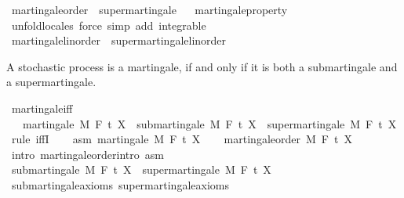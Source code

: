 \begin{isabellebody}
\isanewline
{}\isamarkupfalse%
\ martingale{\isacharunderscore}{\kern0pt}order\ {\isasymsubseteq}\ supermartingale%
\isadelimproof
\ %
\endisadelimproof
%
\isatagproof
{}\isamarkupfalse%
\ martingale{\isacharunderscore}{\kern0pt}property\ \isamarkupfalse%
\ {\isacharparenleft}{\kern0pt}unfold{\isacharunderscore}{\kern0pt}locales{\isacharparenright}{\kern0pt}\ {\isacharparenleft}{\kern0pt}force\ simp\ add{\isacharcolon}{\kern0pt}\ integrable{\isacharparenright}{\kern0pt}{\isacharplus}{\kern0pt}%
\endisatagproof
{\isafoldproof}%
%
\isadelimproof
%
\endisadelimproof
\isanewline
{}\isamarkupfalse%
\ martingale{\isacharunderscore}{\kern0pt}linorder\ {\isasymsubseteq}\ supermartingale{\isacharunderscore}{\kern0pt}linorder%
\isadelimproof
\ %
\endisadelimproof
%
\isatagproof
\isacommand{{\isachardot}{\kern0pt}{\isachardot}{\kern0pt}}\isamarkupfalse%
%
\endisatagproof
{\isafoldproof}%
%
\isadelimproof
%
\endisadelimproof
%
\begin{isamarkuptext}%
A stochastic process is a martingale, if and only if it is both a submartingale and a supermartingale.%
\end{isamarkuptext}\isamarkuptrue%
\isamarkupfalse%
\ martingale{\isacharunderscore}{\kern0pt}iff{\isacharcolon}{\kern0pt}\ \isanewline
\ \ \ {\isachardoublequoteopen}martingale\ M\ F\ t\ X\ {\isasymlongleftrightarrow}\ submartingale\ M\ F\ t\ X\ {\isasymand}\ supermartingale\ M\ F\ t\ X{\isachardoublequoteclose}\isanewline
%
\isadelimproof
%
\endisadelimproof
%
\isatagproof
{}\isamarkupfalse%
\ {\isacharparenleft}{\kern0pt}rule\ iffI{\isacharparenright}{\kern0pt}\isanewline
\ \ \isamarkupfalse%
\ asm{\isacharcolon}{\kern0pt}\ {\isachardoublequoteopen}martingale\ M\ F\ t\ X{\isachardoublequoteclose}\isanewline
\ \ \isamarkupfalse%
\ martingale{\isacharunderscore}{\kern0pt}order\ M\ F\ t\ X\ \isamarkupfalse%
\ {\isacharparenleft}{\kern0pt}intro\ martingale{\isacharunderscore}{\kern0pt}order{\isachardot}{\kern0pt}intro\ asm{\isacharparenright}{\kern0pt}\isanewline
\ \ \isamarkupfalse%
\ {\isachardoublequoteopen}submartingale\ M\ F\ t\ X\ {\isasymand}\ supermartingale\ M\ F\ t\ X{\isachardoublequoteclose}\ \isamarkupfalse%
\ submartingale{\isacharunderscore}{\kern0pt}axioms\ supermartingale{\isacharunderscore}{\kern0pt}axioms\ \isamarkupfalse%

\end{isabellebody}
